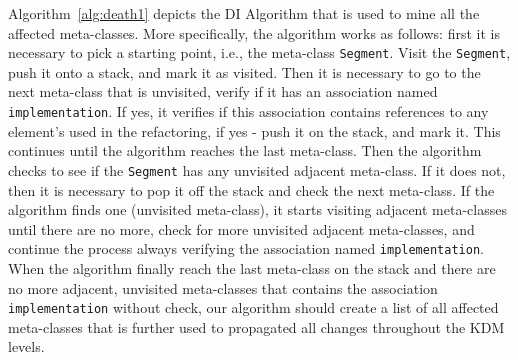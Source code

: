 Algorithm~\ref{alg:death1} depicts the DI Algorithm that is used to mine all the affected meta-classes. %
%
More specifically, the algorithm works as follows: first it is necessary to pick a starting point, i.e., the meta-class \texttt{Segment}. Visit the \texttt{Segment}, push it onto a stack, and mark it as visited. Then it is necessary to go to the next meta-class that is unvisited, verify if it has an association named \texttt{implementation}. If yes, it verifies if this association contains references to any element's used in the refactoring, if yes - push it on the stack, and mark it. This continues until the algorithm reaches the last meta-class. Then the algorithm checks to see if the \texttt{Segment} has any unvisited adjacent meta-class. If it does not, then it is necessary to pop it off the stack and check the next meta-class. If the algorithm finds one (unvisited meta-class), it starts visiting adjacent meta-classes until there are no more, check for more unvisited adjacent meta-classes, and continue the process always verifying the association named \texttt{implementation}. When the algorithm finally reach the last meta-class on the stack and there are no more adjacent, unvisited meta-classes that contains the association \texttt{implementation} without check, our algorithm should create a list of all affected meta-classes that is further used to propagated all changes throughout the KDM levels. 
%
%
%
%
%
%
%
%
%












